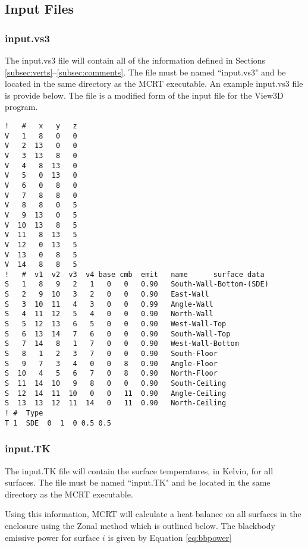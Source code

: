 \documentclass{article}
\begin{document}
\subsection{Input Files}

\subsubsection{input.vs3}

The input.vs3 file will contain all of the information defined in Sections \ref{subsec:verts}--\ref{subsec:comments}. The file must be named ``input.vs3" and be located in the same directory as the MCRT executable. An example input.vs3 file is provide below. The file is a modified form of the input file for the View3D program.

\begin{lstlisting}
!   #   x   y   z
V   1   8   0   0
V   2  13   0   0
V   3  13   8   0
V   4   8  13   0
V   5   0  13   0
V   6   0   8   0
V   7   8   8   0
V   8   8   0   5
V   9  13   0   5
V  10  13   8   5
V  11   8  13   5
V  12   0  13   5
V  13   0   8   5
V  14   8   8   5
!   #  v1  v2  v3  v4 base cmb  emit   name      surface data
S   1   8   9   2   1   0   0   0.90   South-Wall-Bottom-(SDE)
S   2   9  10   3   2   0   0   0.90   East-Wall
S   3  10  11   4   3   0   0   0.99   Angle-Wall
S   4  11  12   5   4   0   0   0.90   North-Wall
S   5  12  13   6   5   0   0   0.90   West-Wall-Top
S   6  13  14   7   6   0   0   0.90   South-Wall-Top
S   7  14   8   1   7   0   0   0.90   West-Wall-Bottom
S   8   1   2   3   7   0   0   0.90   South-Floor
S   9   7   3   4   0   0   8   0.90   Angle-Floor
S  10   4   5   6   7   0   8   0.90   North-Floor
S  11  14  10   9   8   0   0   0.90   South-Ceiling
S  12  14  11  10   0   0   11  0.90   Angle-Ceiling
S  13  13  12  11  14   0   11  0.90   North-Ceiling
! #  Type
T 1  SDE  0  1  0 0.5 0.5
\end{lstlisting}

\subsubsection{input.TK}

The input.TK file will contain the surface temperatures, in Kelvin, for all surfaces. The file must be named ``input.TK" and be located in the same directory as the MCRT executable.

Using this information, MCRT will calculate a heat balance on all surfaces in the enclosure using the Zonal method which is outlined below. The blackbody emissive power for surface $i$ is given by Equation \ref{eq:bbpower}
\end{document}
